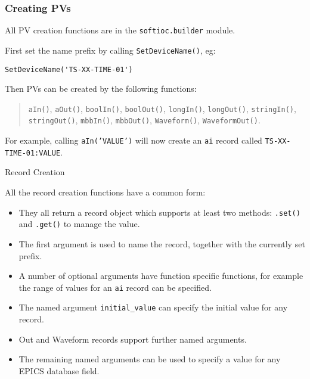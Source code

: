\documentclass{beamer}
\begin{document}
%
\begin{frame}[fragile]\frametitle{Creating PVs}

All PV creation functions are in the \texttt{softioc.builder} module.

\medskip

First set the name prefix by calling \texttt{SetDeviceName()}, eg:

\lstset{language=Python}
\begin{lstlisting}
SetDeviceName('TS-XX-TIME-01')
\end{lstlisting}

Then PVs can be created by the following functions:

\begin{quote}
\texttt{aIn()}, \texttt{aOut()}, \texttt{boolIn()}, \texttt{boolOut()},
\texttt{longIn()}, \texttt{longOut()}, \texttt{stringIn()},
\texttt{stringOut()}, \texttt{mbbIn()}, \texttt{mbbOut()}, \texttt{Waveform()},
\texttt{WaveformOut()}.
\end{quote}

For example, calling \texttt{aIn('VALUE')} will now create an \texttt{ai} record
called \texttt{TS-XX-TIME-01:VALUE}.

\end{frame}


%
\begin{frame}{Record Creation}

All the record creation functions have a common form:

\begin{itemize}
\item They all return a record object which supports at least two methods:
\texttt{.set()} and \texttt{.get()} to manage the value.
\item The first argument is used to name the record, together with the currently
set prefix.
\item A number of optional arguments have function specific functions, for
example the range of values for an \texttt{ai} record can be specified.
\item The named argument \texttt{initial\_value} can specify the initial value
for any record.
\item Out and Waveform records support further named arguments.
\item The remaining named arguments can be used to specify a value for any EPICS
database field.
\end{itemize}

\end{frame}
\end{document}
